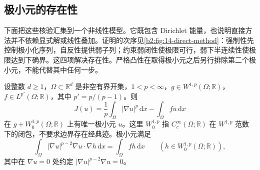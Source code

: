\subsection{极小元的存在性}
\label{b2:subsec:140405}

下面把这些核验汇集到一个非线性模型。它既包含 Dirichlet 能量，也说明直接方法并不依赖显式解或线性叠加。证明的次序见\cref{b2:fig:14-direct-method}：强制性先控制极小化序列，自反性提供弱子列；约束弱闭性使极限可行，弱下半连续性使极限达到下确界。这四项解决存在性。严格凸性在取得极小元之后另行排除第二个极小元，不能代替其中任何一步。



\begin{theorem}[梯度幂能量的极小元]
\label{b2:thm:14-p-energy-minimum}
设整数 \(d\geq1\)，\(\Omega\subset\mathbb R^d\) 是非空有界开集，\(1<p<\infty\)，\(g\in W^{1,p}(\Omega;\mathbb R)\)，\(f\in L^{p'}(\Omega;\mathbb R)\)，其中 \(p'=p/(p-1)\)。则
\[
 J(u)=\frac1p\int_\Omega|\nabla u|^p\,\mathrm dx-\int_\Omega fu\,\mathrm dx
\]
在 \(g+W_0^{1,p}(\Omega;\mathbb R)\) 上有唯一极小元 \(u\)。这里 \(W_0^{1,p}\) 指 \(C_c^\infty(\Omega;\mathbb R)\) 在 \(W^{1,p}\) 范数下的闭包，不要求边界存在经典迹。极小元满足
\[
 \int_\Omega|\nabla u|^{p-2}\nabla u\cdot\nabla h\,\mathrm dx
     =\int_\Omega fh\,\mathrm dx\qquad(h\in W_0^{1,p}(\Omega;\mathbb R)),
\]
其中在 \(\nabla u=0\) 处约定 \(|\nabla u|^{p-2}\nabla u=0\)。
\end{theorem}
